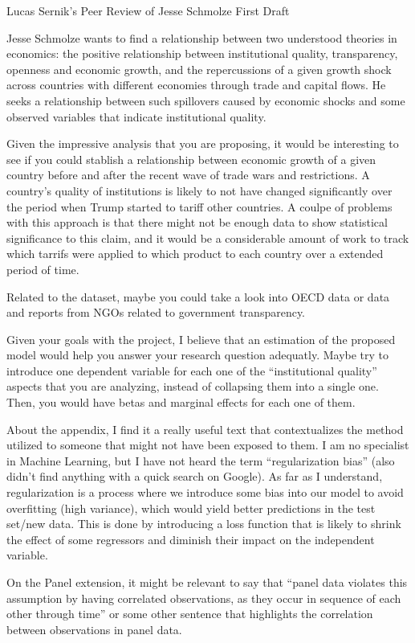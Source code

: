 \documentclass[12pt, a4paper]{article}
\author{Lucas Sernik}
\date{\today}
\begin{document}
{\large Lucas Sernik's Peer Review of Jesse Schmolze First Draft}

\vspace{1 cm}

\quad Jesse Schmolze wants to find a relationship between two understood theories in economics: the positive relationship between institutional quality, transparency, openness and economic growth, and the repercussions of a given growth shock across countries with different economies through trade and capital flows. He seeks a relationship between such spillovers caused by economic shocks and some observed variables that indicate institutional quality.

\quad Given the impressive analysis that you are proposing, it would be interesting to see if you could stablish a relationship between economic growth of a given country before and after the recent wave of trade wars and restrictions. A country's quality of institutions is likely to not have changed significantly over the period when Trump started to tariff other countries. A coulpe of problems with this approach is that there might not be enough data to show statistical significance to this claim, and it would be a considerable amount of work to track which tarrifs were applied to which product to each country over a extended period of time.

\quad Related to the dataset, maybe you could take a look into OECD data or data and reports from NGOs related to government transparency.

\quad Given your goals with the project, I believe that an estimation of the proposed model would help you answer your research question adequatly. Maybe try to introduce one dependent variable for each one of the ``institutional quality'' aspects that you are analyzing, instead of collapsing them into a single one. Then, you would have betas and marginal effects for each one of them.

\quad About the appendix, I find it a really useful text that contextualizes the method utilized to someone that might not have been exposed to them. I am no specialist in Machine Learning, but I have not heard the term ``regularization bias'' (also didn't find anything with a quick search on Google). As far as I understand, regularization is a process where we introduce some bias into our model to avoid overfitting (high variance), which would yield better predictions in the test set/new data. This is done by introducing a loss function that is likely to shrink the effect of some regressors and diminish their impact on the independent variable.

\quad On the Panel extension, it might be relevant to say that ``panel data violates this assumption by having correlated observations, as they occur in sequence of each other through time'' or some other sentence that highlights the correlation between observations in panel data.
\end{document}
